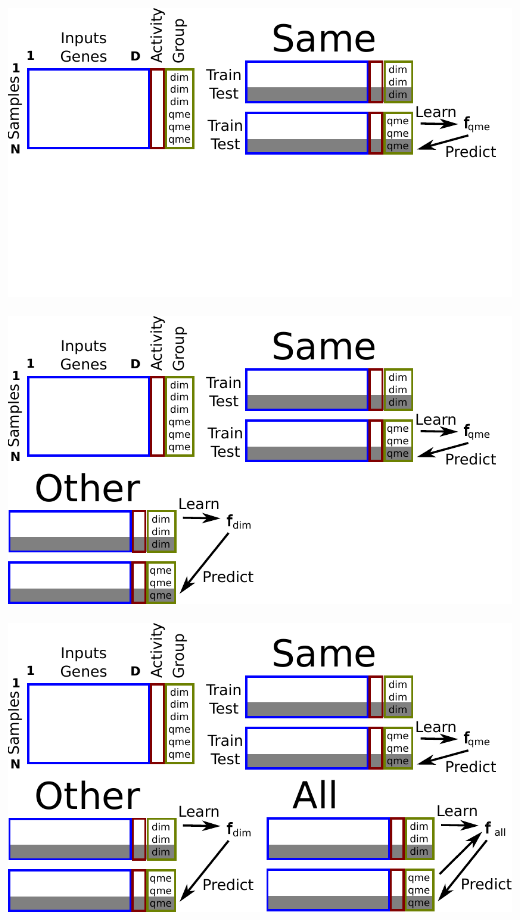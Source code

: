 \documentclass{beamer}
\begin{document}
\begin{frame}
  \includegraphics[width=\textwidth]{drawing-cv-same-other-2}
\end{frame}

\begin{frame}
  \includegraphics[width=\textwidth]{drawing-cv-same-other-3}
\end{frame}

\begin{frame}
  \includegraphics[width=\textwidth]{drawing-cv-same-other-4}
\end{frame}
\end{document}
